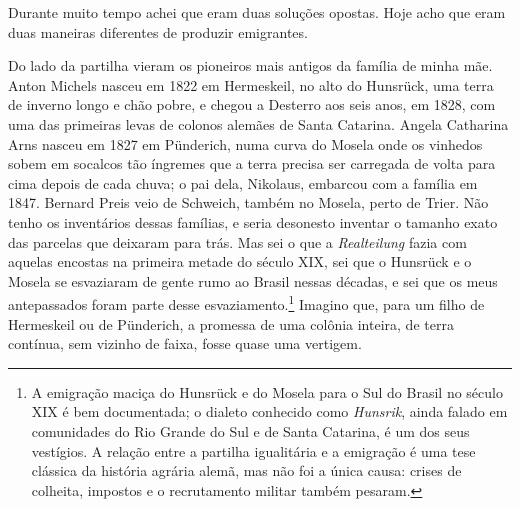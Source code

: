 \documentclass[
  brazilian,
  11pt,
  openany]{book}
\begin{document}
Durante muito tempo achei que eram duas soluções opostas. Hoje acho que
eram duas maneiras diferentes de produzir emigrantes.

Do lado da partilha vieram os pioneiros mais antigos da família de minha
mãe. Anton Michels nasceu em 1822 em Hermeskeil, no alto do Hunsrück,
uma terra de inverno longo e chão pobre, e chegou a Desterro aos seis
anos, em 1828, com uma das primeiras levas de colonos alemães de Santa
Catarina. Angela Catharina Arns nasceu em 1827 em Pünderich, numa curva
do Mosela onde os vinhedos sobem em socalcos tão íngremes que a terra
precisa ser carregada de volta para cima depois de cada chuva; o pai
dela, Nikolaus, embarcou com a família em 1847. Bernard Preis veio de
Schweich, também no Mosela, perto de Trier. Não tenho os inventários
dessas famílias, e seria desonesto inventar o tamanho exato das parcelas
que deixaram para trás. Mas sei o que a \emph{Realteilung} fazia com
aquelas encostas na primeira metade do século XIX, sei que o Hunsrück e
o Mosela se esvaziaram de gente rumo ao Brasil nessas décadas, e sei que
os meus antepassados foram parte desse esvaziamento.\footnote{A
  emigração maciça do Hunsrück e do Mosela para o Sul do Brasil no
  século XIX é bem documentada; o dialeto conhecido como \emph{Hunsrik},
  ainda falado em comunidades do Rio Grande do Sul e de Santa Catarina,
  é um dos seus vestígios. A relação entre a partilha igualitária e a
  emigração é uma tese clássica da história agrária alemã, mas não foi a
  única causa: crises de colheita, impostos e o recrutamento militar
  também pesaram.} Imagino que, para um filho de Hermeskeil ou de
Pünderich, a promessa de uma colônia inteira, de terra contínua, sem
vizinho de faixa, fosse quase uma vertigem.
\end{document}
